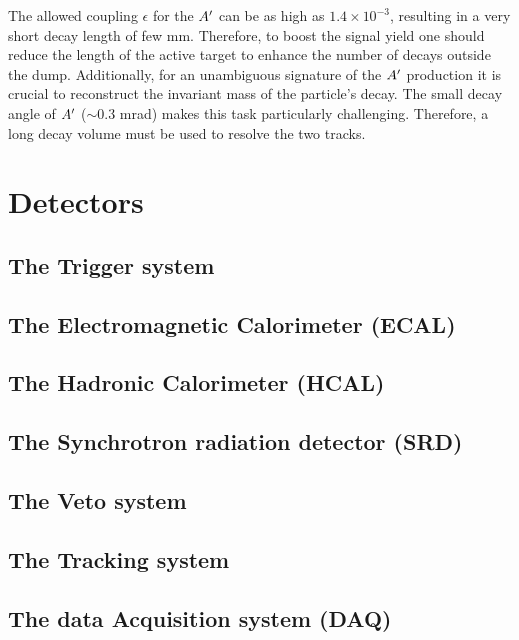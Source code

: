 The allowed coupling $\epsilon$ for the $A'$ can be as high as $1.4 \times 10^{-3}$, resulting in a very short decay length of few mm. Therefore, to boost the signal yield one should reduce the length of the active target to enhance the number of decays outside the dump. Additionally, for an unambiguous signature of the $A'$ production it is crucial to reconstruct the invariant mass of the particle's decay. The small decay angle of $A'$ ($\sim$0.3 mrad) makes this task particularly challenging. Therefore, a long decay volume must be used to resolve the two tracks.

\section{Detectors}
\label{chapter2:sec:detectors}

\subsection{The Trigger system}
\label{chapter2:sec:detectors-trigger}

\subsection{The Electromagnetic Calorimeter (ECAL)}
\label{chapter2:sec:detectors-ecal}

\subsection{The Hadronic Calorimeter (HCAL)}
\label{chapter2:sec:detectors-hcal}

\subsection{The Synchrotron radiation detector (SRD)}
\label{chapter2:sec:detectors-srd}

\subsection{The Veto system}
\label{chapter2:sec:detectors-veto}

\subsection{The Tracking system}
\label{chapter2:sec:detectors-tracking}

\subsection{The data Acquisition system (DAQ)}
\label{chapter2:sec:daq}


